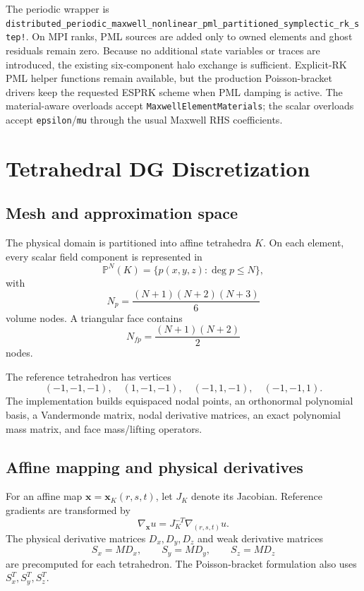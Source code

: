 \documentclass[11pt,oneside]{book}
\newcommand{\code}[1]{\texttt{#1}}
\newcommand{\vect}[1]{\boldsymbol{#1}}
\begin{document}
The periodic wrapper is
\code{distributed\_periodic\_maxwell\_nonlinear\_pml\_partitioned\_symplectic\_rk\_step!}.
On MPI ranks, PML sources are added only to owned elements and ghost residuals
remain zero. Because no additional state variables or traces are introduced,
the existing six-component halo exchange is sufficient. Explicit-RK PML helper
functions remain available, but the production Poisson-bracket drivers keep the
requested ESPRK scheme when PML damping is active. The material-aware overloads
accept \code{MaxwellElementMaterials}; the scalar overloads accept
\code{epsilon}/\code{mu} through the usual Maxwell RHS coefficients.

\chapter{Tetrahedral DG Discretization}

\section{Mesh and approximation space}

The physical domain is partitioned into affine tetrahedra $K$. On each element,
every scalar field component is represented in
\begin{equation}
  \mathbb P^N(K)
  =
  \{p(x,y,z): \deg p\leq N\},
\end{equation}
with
\begin{equation}
  N_p = \frac{(N+1)(N+2)(N+3)}{6}
\end{equation}
volume nodes. A triangular face contains
\begin{equation}
  N_{fp} = \frac{(N+1)(N+2)}{2}
\end{equation}
nodes.

The reference tetrahedron has vertices
\[
(-1,-1,-1),\quad
(1,-1,-1),\quad
(-1,1,-1),\quad
(-1,-1,1).
\]
The implementation builds equispaced nodal points, an orthonormal polynomial
basis, a Vandermonde matrix, nodal derivative matrices, an exact polynomial
mass matrix, and face mass/lifting operators.

\section{Affine mapping and physical derivatives}

For an affine map $\vect x=\vect x_K(r,s,t)$, let $J_K$ denote its Jacobian.
Reference gradients are transformed by
\begin{equation}
  \nabla_{\vect x} u
  =
  J_K^{-T}\nabla_{(r,s,t)}u.
\end{equation}
The physical derivative matrices $D_x,D_y,D_z$ and weak derivative matrices
\begin{equation}
  S_x = M D_x,\qquad S_y=M D_y,\qquad S_z=M D_z
\end{equation}
are precomputed for each tetrahedron. The Poisson-bracket formulation also
uses $S_x^T,S_y^T,S_z^T$.
\end{document}
